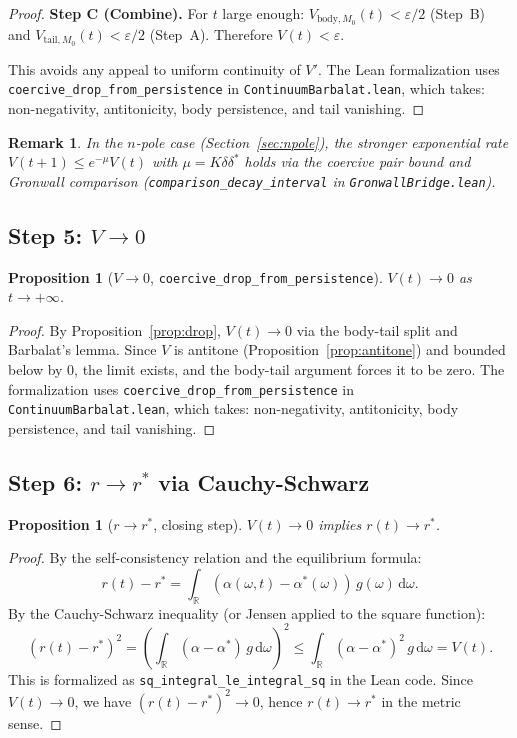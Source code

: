 \documentclass[11pt,a4paper]{article}
\newtheorem{proposition}[theorem]{Proposition}
\newtheorem{remark}[theorem]{Remark}
\theoremstyle{definition}
\newcommand{\R}{\mathbb{R}}
\begin{document}
\begin{proof}
\textbf{Step C (Combine).} For $t$ large enough: $V_{\mathrm{body},M_0}(t) < \varepsilon/2$ (Step~B) and $V_{\mathrm{tail},M_0}(t) < \varepsilon/2$ (Step~A). Therefore $V(t) < \varepsilon$.

This avoids any appeal to uniform continuity of $V'$. The Lean formalization uses \texttt{coercive\_drop\_from\_persistence} in \texttt{ContinuumBarbalat.lean}, which takes: non-negativity, antitonicity, body persistence, and tail vanishing.
\end{proof}

\begin{remark}
In the $n$-pole case (Section~\ref{sec:npole}), the stronger exponential rate $V(t+1) \leq e^{-\mu}V(t)$ with $\mu = K\delta\delta^*$ holds via the coercive pair bound and Gronwall comparison (\texttt{comparison\_decay\_interval} in \texttt{GronwallBridge.lean}).
\end{remark}

\subsection{Step 5: $V \to 0$}

\begin{proposition}[$V \to 0$, \texttt{coercive\_drop\_from\_persistence}]\label{prop:vzero}
$V(t) \to 0$ as $t \to +\infty$.
\end{proposition}

\begin{proof}
By Proposition~\ref{prop:drop}, $V(t) \to 0$ via the body-tail split and Barbalat's lemma. Since $V$ is antitone (Proposition~\ref{prop:antitone}) and bounded below by $0$, the limit exists, and the body-tail argument forces it to be zero. The formalization uses \texttt{coercive\_drop\_from\_persistence} in \texttt{ContinuumBarbalat.lean}, which takes: non-negativity, antitonicity, body persistence, and tail vanishing.
\end{proof}

\subsection{Step 6: $r \to r^*$ via Cauchy-Schwarz}\label{sec:cauchy}

\begin{proposition}[$r \to r^*$, closing step]\label{prop:rconv}
$V(t) \to 0$ implies $r(t) \to r^*$.
\end{proposition}

\begin{proof}
By the self-consistency relation and the equilibrium formula:
\[
r(t) - r^* = \int_\R (\alpha(\omega,t) - \alpha^*(\omega))\,g(\omega)\,\mathrm{d}\omega.
\]
By the Cauchy-Schwarz inequality (or Jensen applied to the square function):
\[
(r(t) - r^*)^2 = \left(\int_\R (\alpha - \alpha^*)\,g\,\mathrm{d}\omega\right)^2 \leq \int_\R (\alpha - \alpha^*)^2\,g\,\mathrm{d}\omega = V(t).
\]
This is formalized as \texttt{sq\_integral\_le\_integral\_sq} in the Lean code. Since $V(t) \to 0$, we have $(r(t)-r^*)^2 \to 0$, hence $r(t) \to r^*$ in the metric sense.
\end{proof}
\end{document}
